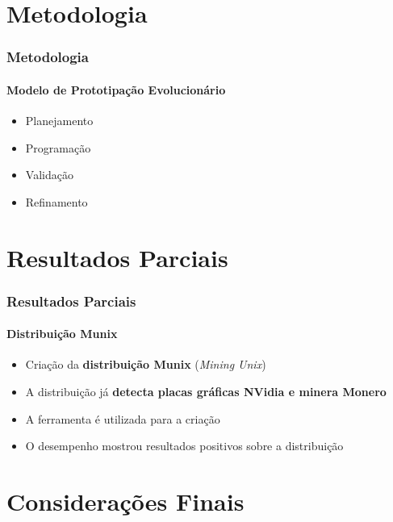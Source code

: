 \documentclass[aspectratio=43]{beamer}
\begin{document}
\section{Metodologia}
\begin{frame}
    \frametitle{Metodologia}
    \framesubtitle{Modelo de Prototipação Evolucionário}

    \begin{itemize}
        \item Planejamento

        \item Programação

        \item Validação

        \item Refinamento

    \end{itemize}
\end{frame}

\section{Resultados Parciais}

\begin{frame}
    \frametitle{Resultados Parciais}
    \framesubtitle{Distribuição Munix}

    \begin{itemize}
        \item Criação da \textbf{distribuição Munix} (\emph{Mining Unix}) 

        \item A distribuição já \textbf{detecta placas gráficas NVidia e
            minera Monero}

        \item A ferramenta  é utilizada para a criação

        \item O desempenho mostrou resultados positivos sobre a
            distribuição

    \end{itemize}
\end{frame}


\section{Considerações Finais}
\end{document}
